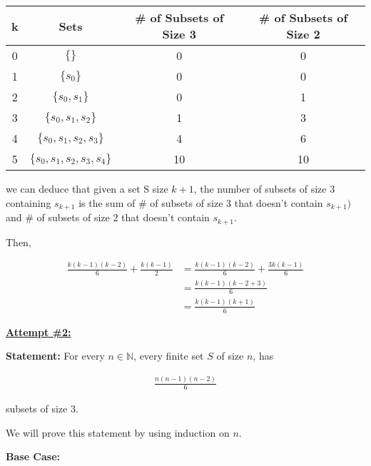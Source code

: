 \documentclass[12pt]{article}
\begin{document}
\begin{itemize}
    \begin{tabular}{|c|c|c|c|}
        \hline
        k & Sets & \# of Subsets of Size 3 & \# of Subsets of Size 2\\
        \hline
        0 & $\{\}$ & 0 & 0\\
        \hline
        1 & $\{s_0\}$ & 0 & 0\\
        \hline
        2 & $\{s_0,s_1\}$ & 0 & 1\\
        \hline
        3 & $\{s_0,s_1,s_2\}$ & 1 & 3\\
        \hline
        4 & $\{s_0,s_1,s_2,s_3\}$ & 4 & 6\\
        \hline
        5 & $\{s_0,s_1,s_2,s_3,s_4\}$ & 10 & 10\\
        \hline
    \end{tabular}

    we can deduce that given a set S size $k+1$, the number of subsets of size 3
    containing $s_{k+1}$ is the sum of \# of subsets of size 3 that doesn't
    contain $s_{k+1})$ and \# of subsets of size 2 that doesn't contain $s_{k+1}$.

    \bigskip

    Then,

    \begin{align}
        \frac{k(k-1)(k-2)}{6} + \frac{k(k-1)}{2} &= \frac{k(k-1)(k-2)}{6} + \frac{3k(k-1)}{6}\\
        &= \frac{k(k-1)(k-2+3)}{6}\\
        &= \frac{k(k-1)(k+1)}{6}
    \end{align}

    \bigskip

    \begin{mdframed}
        \underline{\textbf{Attempt \#2:}}

        \bigskip

        \textbf{Statement:} For every $n \in \mathbb{N}$, every finite set $S$ of size $n$,
        has

        \setcounter{equation}{0}
        \begin{align}
            \frac{n(n-1)(n-2)}{6}
        \end{align}

        subsets of size 3.

        \bigskip

        We will prove this statement by using induction on $n$.

        \bigskip

        \textbf{Base Case:}


\end{mdframed}
\end{itemize}
\end{document}
